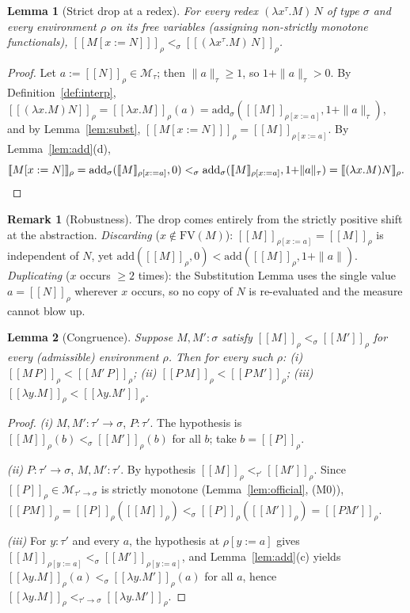 \documentclass{amsart}
\newtheorem{lemma}{Lemma}
\theoremstyle{definition}
\newtheorem{remark}{Remark}
\newcommand{\interp}[1]{[\![#1]\!]}
\newcommand{\FV}{\mathrm{FV}}
\begin{document}
\begin{lemma}[Strict drop at a redex]\label{lem:redex}
For every redex $(\lambda x^\tau.M)\,N$ of type $\sigma$ and every environment $\rho$ on its
free variables (assigning non-strictly monotone functionals),
$\interp{M[x:=N]}_\rho<_\sigma\interp{(\lambda x^\tau.M)\,N}_\rho$.
\end{lemma}

\begin{proof}
Let $a:=\interp N_\rho\in\mathcal M_\tau$; then $\|a\|_\tau\ge1$, so $1+\|a\|_\tau>0$. By
Definition~\ref{def:interp},
$\interp{(\lambda x.M)N}_\rho=\interp{\lambda x.M}_\rho(a)=
\mathrm{add}_\sigma(\interp{M}_{\rho[x:=a]},1{+}\|a\|_\tau)$, and by Lemma~\ref{lem:subst},
$\interp{M[x:=N]}_\rho=\interp{M}_{\rho[x:=a]}$. By Lemma~\ref{lem:add}(d),
\[
  \interp{M[x:=N]}_\rho=\mathrm{add}_\sigma(\interp{M}_{\rho[x:=a]},0)
  <_\sigma\mathrm{add}_\sigma(\interp{M}_{\rho[x:=a]},1{+}\|a\|_\tau)=\interp{(\lambda x.M)N}_\rho.\qedhere
\]
\end{proof}

\begin{remark}[Robustness]
The drop comes entirely from the strictly positive shift at the abstraction.
\emph{Discarding} ($x\notin\FV(M)$): $\interp{M}_{\rho[x:=a]}=\interp{M}_\rho$ is independent
of $N$, yet $\mathrm{add}(\interp M_\rho,0)<\mathrm{add}(\interp M_\rho,1{+}\|a\|)$.
\emph{Duplicating} ($x$ occurs $\ge2$ times): the Substitution Lemma uses the single value
$a=\interp N_\rho$ wherever $x$ occurs, so no copy of $N$ is re-evaluated and the measure
cannot blow up.
\end{remark}

\begin{lemma}[Congruence]\label{lem:cong}
Suppose $M,M':\sigma$ satisfy $\interp{M}_\rho<_\sigma\interp{M'}_\rho$ for every
\emph{(}admissible\emph{)} environment $\rho$. Then for every such $\rho$:
\textup{(i)} $\interp{M\,P}_\rho<\interp{M'\,P}_\rho$;
\textup{(ii)} $\interp{P\,M}_\rho<\interp{P\,M'}_\rho$;
\textup{(iii)} $\interp{\lambda y.M}_\rho<\interp{\lambda y.M'}_\rho$.
\end{lemma}

\begin{proof}
\emph{(i)} $M,M':\tau'\to\sigma$, $P:\tau'$. The hypothesis is
$\interp{M}_\rho(b)<_\sigma\interp{M'}_\rho(b)$ for all $b$; take $b=\interp P_\rho$.

\emph{(ii)} $P:\tau'\to\sigma$, $M,M':\tau'$. By hypothesis
$\interp{M}_\rho<_{\tau'}\interp{M'}_\rho$. Since $\interp P_\rho\in\mathcal M_{\tau'\to\sigma}$
is strictly monotone (Lemma~\ref{lem:official}, (M0)),
$\interp{PM}_\rho=\interp P_\rho(\interp M_\rho)<_\sigma\interp P_\rho(\interp{M'}_\rho)=\interp{PM'}_\rho$.

\emph{(iii)} For $y:\tau'$ and every $a$, the hypothesis at $\rho[y:=a]$ gives
$\interp{M}_{\rho[y:=a]}<_\sigma\interp{M'}_{\rho[y:=a]}$, and Lemma~\ref{lem:add}(c) yields
$\interp{\lambda y.M}_\rho(a)<_\sigma\interp{\lambda y.M'}_\rho(a)$ for all $a$, hence
$\interp{\lambda y.M}_\rho<_{\tau'\to\sigma}\interp{\lambda y.M'}_\rho$.
\end{proof}
\end{document}
